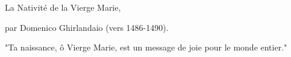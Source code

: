 La Nativité de la Vierge Marie,\par
par Domenico Ghirlandaio (vers 1486-1490).\par
"Ta naissance, ô Vierge Marie, est un message de joie pour le monde entier."
